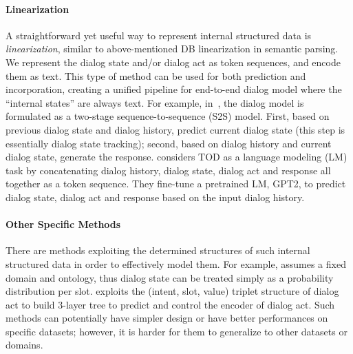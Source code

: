 \documentclass[11pt,dvipdfm]{article}
\begin{document}
\paragraph{Linearization}
A straightforward yet useful way to represent internal structured data is \textit{linearization}, similar to above-mentioned DB linearization in semantic parsing. We represent the dialog state and/or dialog act as token sequences, and encode them as text.
This type of method can be used for both prediction and incorporation, creating a unified pipeline for end-to-end dialog model where the ``internal states'' are always text.
For example, in~\cite{sequicity}, the dialog model is formulated as a two-stage sequence-to-sequence (S2S) model. First, based on previous dialog state and dialog history, predict current dialog state (this step is essentially dialog state tracking); second, based on dialog history and current dialog state, generate the response.
\cite{ham2020-gpt2-tod} considers TOD as a language modeling (LM) task by concatenating dialog history, dialog state, dialog act and response all together as a token sequence. They fine-tune a pretrained LM, GPT2, to predict dialog state, dialog act and response based on the input dialog history.

\paragraph{Other Specific Methods}
There are methods exploiting the determined structures of such internal structured data in order to effectively model them. For example, \cite{wen2017EndtoEnd} assumes a fixed domain and ontology, thus dialog state can be treated simply as a probability distribution per slot.
\cite{chen2019SemanticallyConditioned} exploits the (intent, slot, value) triplet structure of dialog act to build 3-layer tree to predict and control the encoder of dialog act.
Such methods can potentially have simpler design or have better performances on specific datasets; however, it is harder for them to generalize to other datasets or domains.
\end{document}
